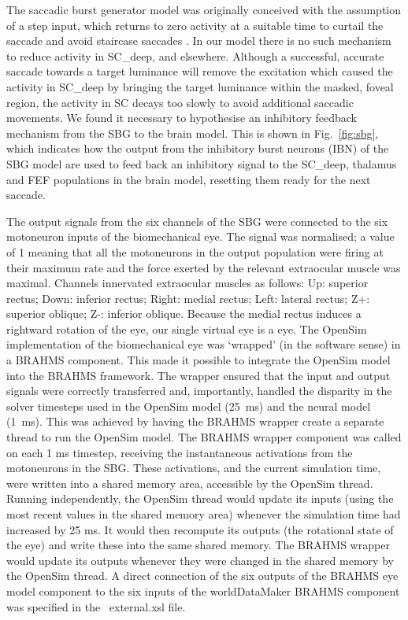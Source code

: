 \documentclass{frontiersSCNS}
\begin{document}
The saccadic burst generator model was originally conceived with the
assumption of a step input, which returns to zero activity at a
suitable time to curtail the saccade and avoid staircase
saccades \citep{gancarz_neural_1998}. In our model there is no such
mechanism to reduce activity in SC\_deep, and elsewhere.  Although a
successful, accurate saccade towards a target luminance will remove
the excitation which caused the activity in SC\_deep by bringing the
target luminance within the masked, foveal region, the activity in SC
decays too slowly to avoid additional saccadic movements. We found it
necessary to hypothesise an inhibitory feedback mechanism from the SBG
to the brain model.  This is shown in Fig.~\ref{fig:sbg}, which
indicates how the output from the inhibitory burst neurons (IBN) of
the SBG model are used to feed back an inhibitory signal to the
SC\_deep, thalamus and FEF populations in the brain model, resetting
them ready for the next saccade. 

The output signals from the six channels of the SBG were connected to
the six motoneuron inputs of the biomechanical eye. The signal was
normalised; a value of 1 meaning that all the motoneurons in the
output population were firing at their maximum rate and the force
exerted by the relevant extraocular muscle was maximal. Channels
innervated extraocular muscles as follows: Up: superior rectus; Down:
inferior rectus; Right: medial rectus; Left: lateral rectus; Z+:
superior oblique; Z-: inferior oblique. Because the medial rectus
induces a rightward rotation of the eye, our single virtual eye is
a  eye. The OpenSim implementation of the biomechanical eye
was `wrapped' (in the software sense) in a BRAHMS component. This made
it possible to integrate the OpenSim model into the BRAHMS
framework. The wrapper ensured that the input and output signals were
correctly transferred and, importantly, handled the disparity in the
solver timesteps used in the OpenSim model (25~ms) and the neural
model (1~ms). This was achieved by having the BRAHMS wrapper create a
separate thread to run the OpenSim model. The BRAHMS wrapper component
was called on each 1 ms timestep, receiving the instantaneous
activations from the motoneurons in the SBG. These activations, and
the current simulation time, were written into a shared memory area,
accessible by the OpenSim thread. Running independently, the OpenSim
thread would update its inputs (using the most recent values in the
shared memory area) whenever the simulation time had increased by 25
ms. It would then recompute its outputs (the rotational state of the
eye) and write these into the same shared memory. The BRAHMS wrapper
would update its outputs whenever they were changed in the shared
memory by the OpenSim thread. A direct connection of the six outputs
of the BRAHMS eye model component to the six inputs of the
worldDataMaker BRAHMS component was specified in
the \stob~external.xsl file.
\end{document}
